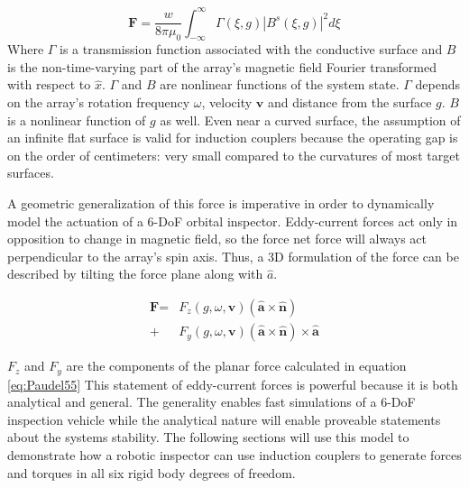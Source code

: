 \documentclass[letterpaper, 10 pt, conference]{ieeeconf}  %
\begin{document}
\begin{equation}
\label{eq:Paudel55}
\textbf{F} = \frac{w}{8\pi\mu_0} \int^{\infty}_{-\infty}\Gamma(\xi,g)|B^s(\xi,g)|^2 d\xi
\end{equation}
Where $\Gamma$ is a transmission function associated with the conductive surface and $B$ is the non-time-varying part of the array's magnetic field Fourier transformed with respect to $\hat{x}$.
% 
 $\Gamma$ and $B$ are nonlinear functions of the system state. $\Gamma$ depends on the array's rotation frequency $\omega$, velocity $\textbf{v}$ and distance from the surface $g$. $B$ is a nonlinear function of $g$ as well. Even near a curved surface, the assumption of an infinite flat surface is valid for induction couplers because the operating gap is on the order of centimeters: very small compared to the curvatures of most target surfaces. 
 
A geometric generalization of this force is imperative in order to dynamically model the actuation of a 6-DoF orbital inspector. Eddy-current forces act only in opposition to change in magnetic field, so the force net force will always act perpendicular to the array's spin axis. Thus, a 3D formulation of the force can be described by tilting the force plane along with $\hat{a}$. 

\begin{equation}
\label{eq:arrayForce}
\begin{split}
\textbf{F} =  &F_z(g,\omega,\textbf{v}) \left(\hat{\textbf{a}} \times \hat{\textbf{n}} \right) \\
			 + &F_y(g,\omega,\textbf{v}) \left(\hat{\textbf{a}} \times \hat{\textbf{n}} \right) \times \hat{\textbf{a}}
 \end{split}
 \end{equation}
 
 $F_z$ and $F_y$ are the components of the planar force calculated in equation \ref{eq:Paudel55}
 This statement of eddy-current forces is powerful because it is both analytical and general. The generality enables fast simulations of a 6-DoF inspection vehicle while the analytical nature will enable proveable statements about the systems stability.
 The following sections will use this model to demonstrate how a robotic inspector can use induction couplers to generate forces and torques in all six rigid body degrees of freedom.
\end{document}
